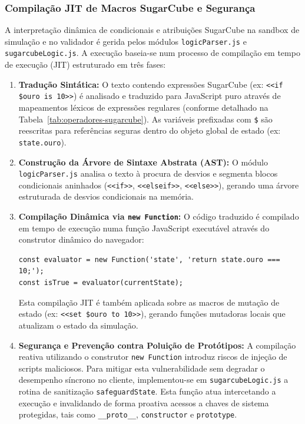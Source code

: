 \subsubsection{Compilação JIT de Macros SugarCube e Segurança}
\label{subsec:compilador-jit-macros-impl}
A interpretação dinâmica de condicionais e atribuições SugarCube na sandbox de simulação e no validador é gerida pelos módulos \texttt{logicParser.js} e \texttt{sugarcubeLogic.js}. A execução baseia-se num processo de compilação em tempo de execução (JIT) estruturado em três fases:
\begin{enumerate}
    \item \textbf{Tradução Sintática:} O texto contendo expressões SugarCube (ex: \texttt{<<if \$ouro is 10>>}) é analisado e traduzido para JavaScript puro através de mapeamentos léxicos de expressões regulares (conforme detalhado na Tabela~\ref{tab:operadores-sugarcube}). As variáveis prefixadas com \texttt{\$} são reescritas para referências seguras dentro do objeto global de estado (ex: \texttt{state.ouro}).
    
    \item \textbf{Construção da Árvore de Sintaxe Abstrata (AST):} O módulo \texttt{logicParser.js} analisa o texto à procura de desvios e segmenta blocos condicionais aninhados (\texttt{<<if>>}, \texttt{<<elseif>>}, \texttt{<<else>>}), gerando uma árvore estruturada de desvios condicionais na memória.
    
    \item \textbf{Compilação Dinâmica via \texttt{new Function}:} O código traduzido é compilado em tempo de execução numa função JavaScript executável através do construtor dinâmico do navegador:
    \begin{verbatim}
const evaluator = new Function('state', 'return state.ouro === 10;');
const isTrue = evaluator(currentState);
    \end{verbatim}
    Esta compilação JIT é também aplicada sobre as macros de mutação de estado (ex: \texttt{<<set \$ouro to 10>>}), gerando funções mutadoras locais que atualizam o estado da simulação.
    
    \item \textbf{Segurança e Prevenção contra Poluição de Protótipos:} A compilação reativa utilizando o construtor \texttt{new Function} introduz riscos de injeção de scripts maliciosos. Para mitigar esta vulnerabilidade sem degradar o desempenho síncrono no cliente, implementou-se em \texttt{sugarcubeLogic.js} a rotina de sanitização \texttt{safeguardState}. Esta função atua intercetando a execução e invalidando de forma proativa acessos a chaves de sistema protegidas, tais como \texttt{\_\_proto\_\_}, \texttt{constructor} e \texttt{prototype}.
\end{enumerate}

